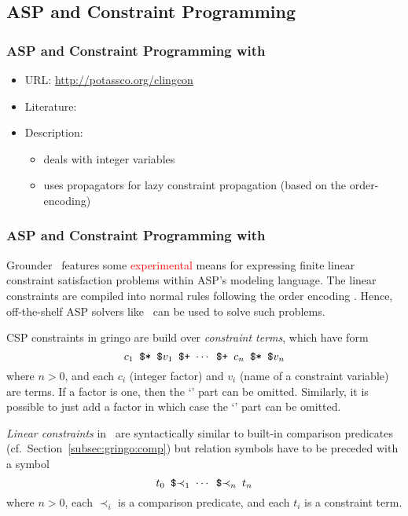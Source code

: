 \subsection{ASP and Constraint Programming}\label{sec:constraint}

\subsubsection{ASP and Constraint Programming with \clingcon}
\label{sec:clingcon}

\begin{itemize}
\item URL: \url{http://potassco.org/clingcon}
\item Literature: \cite{bakaossc16a}
\item Description:  
  \begin{itemize}
  \item deals with integer variables
  \item uses propagators for lazy constraint propagation (based on the order-encoding) 
  \end{itemize}
\end{itemize}

\subsubsection{ASP and Constraint Programming with \gringo}

Grounder \gringo\ features some \textcolor{red}{experimental} means for expressing finite linear constraint satisfaction problems within ASP's modeling language.
The linear constraints are compiled into normal rules following the order encoding \cite{tatakiba09a,bageinscsotawe13a}.
Hence, off-the-shelf ASP solvers like \clasp\ can be used to solve such problems.

CSP constraints in gringo are build over \emph{constraint terms}, which have form
\[\texttt{$c_1$~\$*~\$$v_1$~\$+~$\cdots$~\$+~$c_n$~\$*~\$$v_n$}\]
where $n>0$, and each $c_i$ (integer factor) and $v_i$ (name of a constraint variable) are terms.
If a factor is one, then the `' part can be omitted.
Similarly, it is possible to just add a factor in which case the `' part can be omitted.

\emph{Linear constraints} in \gringo\ are syntactically similar to built-in comparison predicates (cf.\ Section~\ref{subsec:gringo:comp})
but relation symbols have to be preceded with a \code{\$} symbol
\[\texttt{$t_0$~\$$\prec_1$~$\cdots$~\$$\prec_{n}$~$t_n$}\]
where $n>0$, each $\prec_i$ is a comparison predicate, and each $t_i$ is a constraint term.

